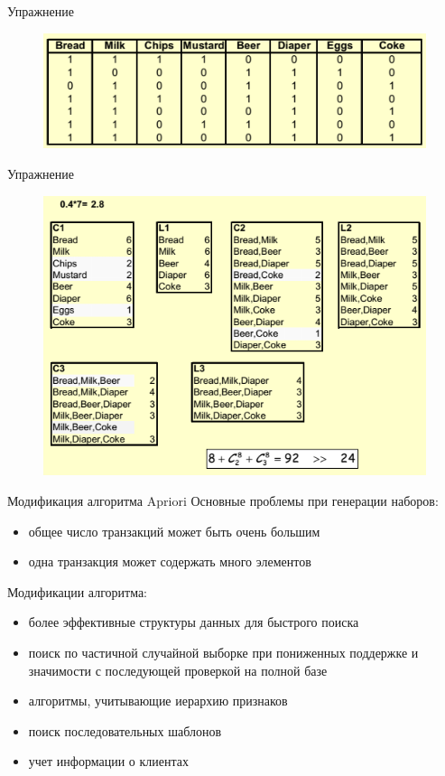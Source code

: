 \documentclass{beamer}
\begin{document}
\begin{frame}{Упражнение}
\begin{figure}[h]
\centering
\includegraphics[scale=0.75]{images/lec08-pic18.png}
\end{figure}
\end{frame}

\begin{frame}{Упражнение}
\begin{figure}[h]
\centering
\includegraphics[scale=0.75]{images/lec08-pic19.png}
\end{figure}
\end{frame}

\begin{frame}{Модификация алгоритма Apriori}
Основные проблемы при генерации наборов:
\begin{itemize}
\item общее число транзакций может быть очень большим
\item одна транзакция может содержать много элементов
\end{itemize}
Модификации алгоритма:
\begin{itemize}
\item более эффективные структуры данных для быстрого поиска
\item поиск по частичной случайной выборке при пониженных поддержке и значимости с последующей проверкой на полной базе
\item алгоритмы, учитывающие иерархию признаков
\item поиск последовательных шаблонов
\item учет информации о клиентах
\end{itemize}
\end{frame}
\end{document}
